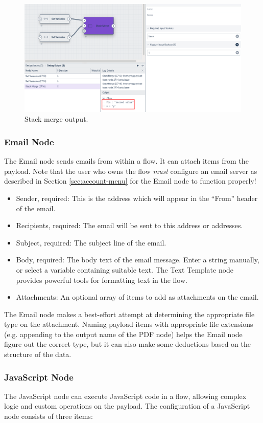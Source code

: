 \begin{figure}
	\includegraphics[width=0.85\linewidth]{images/stackmerge2.png}
	\caption{Stack merge output.}
	\label{fig:stackmerge2}
\end{figure}

\subsubsection{Email Node}
The Email node sends emails from within a flow. It can attach items from the payload. Note that the user who owns the flow \emph{must} configure an email server as described in Section \ref{sec:account-menu} for the Email node to function properly!

\begin{itemize}
\item Sender, required: This is the address which will appear in the ``From'' header of the email.
\item Recipients, required: The email will be sent to this address or addresses.
\item Subject, required: The subject line of the email.
\item Body, required: The body text of the email message. Enter a string manually, or select a variable containing suitable text. The Text Template node provides powerful tools for formatting text in the flow.
\item Attachments: An optional array of items to add as attachments on the email.
\end{itemize}

The Email node makes a best-effort attempt at determining the appropriate file type on the attachment. Naming payload items with appropriate file extensions (e.g. appending  to the output name of the PDF node) helps the Email node figure out the correct type, but it can also make some deductions based on the structure of the data.

\subsubsection{JavaScript Node}
The JavaScript node can execute JavaScript code in a flow, allowing complex logic and custom operations on the payload. The configuration of a JavaScript node consists of three items:

